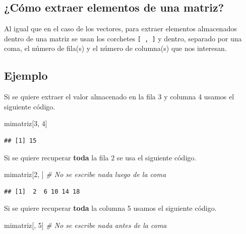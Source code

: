 \documentclass[
]{book}
\newenvironment{Shaded}{\begin{snugshade}}{\end{snugshade}}
\newcommand{\CommentTok}[1]{\textcolor[rgb]{0.56,0.35,0.01}{\textit{#1}}}
\newcommand{\DecValTok}[1]{\textcolor[rgb]{0.00,0.00,0.81}{#1}}
\newcommand{\NormalTok}[1]{#1}
\begin{document}
\hypertarget{cuxf3mo-extraer-elementos-de-una-matriz}{%
\subsection{¿Cómo extraer elementos de una matriz?}\label{cuxf3mo-extraer-elementos-de-una-matriz}}

Al igual que en el caso de los vectores, para extraer elementos almacenados dentro de una matriz se usan los corchetes \texttt{{[}\ ,\ {]}} y dentro, separado por una coma, el número de fila(s) y el número de columna(s) que nos interesan.

\hypertarget{ejemplo-1}{%
\subsection*{Ejemplo}\label{ejemplo-1}}

Si se quiere extraer el valor almacenado en la fila 3 y columna 4 usamos el siguiente código.

\begin{Shaded}
\begin{Highlighting}[]
\NormalTok{mimatriz[}\DecValTok{3}\NormalTok{, }\DecValTok{4}\NormalTok{]}
\end{Highlighting}
\end{Shaded}

\begin{verbatim}
## [1] 15
\end{verbatim}

Si se quiere recuperar \textbf{toda} la fila 2 se usa el siguiente código.

\begin{Shaded}
\begin{Highlighting}[]
\NormalTok{mimatriz[}\DecValTok{2}\NormalTok{, ]  }\CommentTok{\# No se escribe nada luego de la coma}
\end{Highlighting}
\end{Shaded}

\begin{verbatim}
## [1]  2  6 10 14 18
\end{verbatim}

Si se quiere recuperar \textbf{toda} la columna 5 usamos el siguiente código.

\begin{Shaded}
\begin{Highlighting}[]
\NormalTok{mimatriz[, }\DecValTok{5}\NormalTok{]  }\CommentTok{\# No se escribe nada antes de la coma}
\end{Highlighting}
\end{Shaded}
\end{document}

